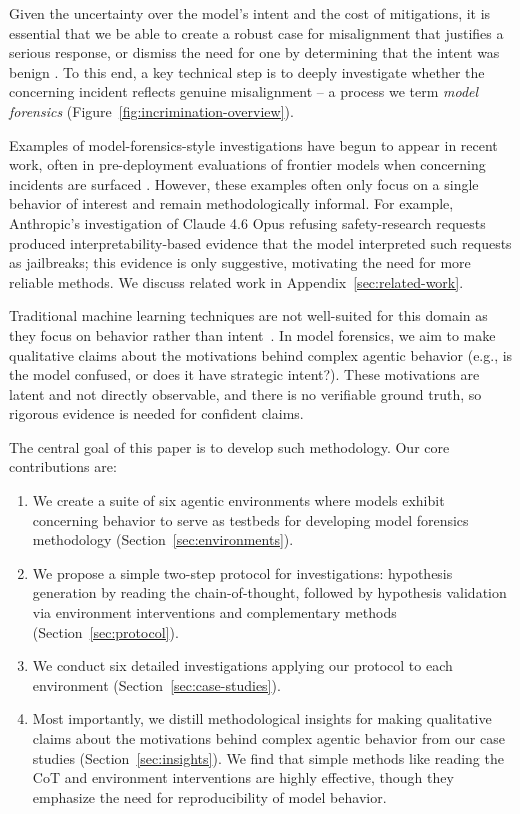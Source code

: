 \documentclass{article}
\begin{document}
Given the uncertainty over the model's intent and the cost of mitigations, it is essential that we be able to create a robust case for misalignment that justifies a serious response, or dismiss the need for one by determining that the intent was benign \citep{greenblatt2025legible}. To this end, a key technical step is to deeply investigate whether the concerning incident reflects genuine misalignment -- a process we term \textit{model forensics} (Figure~\ref{fig:incrimination-overview}).

Examples of model-forensics-style investigations have begun to appear in recent work, often in pre-deployment evaluations of frontier models when concerning incidents are surfaced \citep{rajamanoharan2025shutdown, anthropic2025opus45systemcard, anthropic2026opus46systemcard, souly2026ukaisi, sheshadri2025alignment, meinke2024scheming}. However, these examples often only focus on a single behavior of interest and remain methodologically informal. For example, Anthropic's investigation of Claude 4.6 Opus refusing safety-research requests produced interpretability-based evidence that the model interpreted such requests as jailbreaks; this evidence is only suggestive, motivating the need for more reliable methods. We discuss related work in Appendix~\ref{sec:related-work}.

Traditional machine learning techniques are not well-suited for this domain as they focus on behavior rather than intent~\citep{nanda2025interp}. In model forensics, we aim to make qualitative claims about the motivations behind complex agentic behavior (e.g., is the model confused, or does it have strategic intent?). These motivations are latent and not directly observable, and there is no verifiable ground truth, so rigorous evidence is needed for confident claims.

The central goal of this paper is to develop such methodology. Our core contributions are:

\begin{enumerate}
    \item We create a suite of six agentic environments where models exhibit concerning behavior to serve as testbeds for developing model forensics methodology (Section~\ref{sec:environments}).
    \item We propose a simple two-step protocol for investigations: hypothesis generation by reading the chain-of-thought, followed by hypothesis validation via environment interventions and complementary methods (Section~\ref{sec:protocol}).
    \item We conduct six detailed investigations applying our protocol to each environment (Section~\ref{sec:case-studies}).
    \item Most importantly, we distill methodological insights for making qualitative claims about the motivations behind complex agentic behavior from our case studies (Section~\ref{sec:insights}). We find that simple methods like reading the CoT and environment interventions are highly effective, though they emphasize the need for reproducibility of model behavior.
\end{enumerate}
\end{document}
